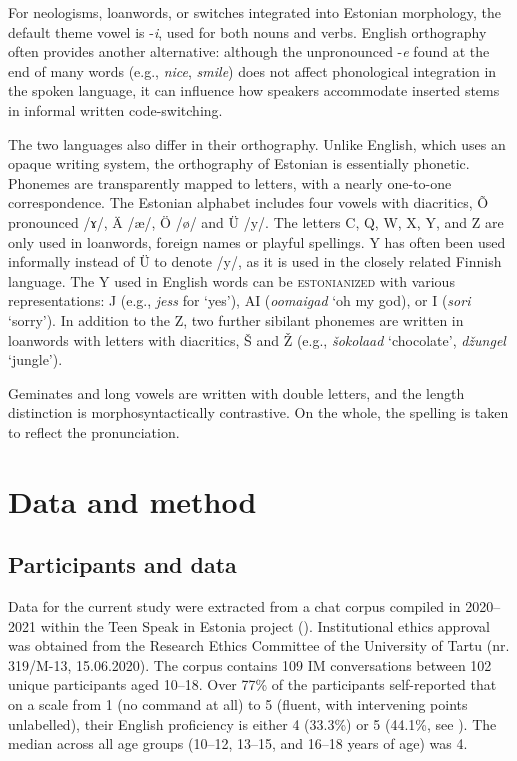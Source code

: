 \documentclass[output=paper]{langscibook}
\begin{document}
For neologisms, loanwords, or switches integrated into Estonian morphology, the default theme vowel is -\textit{i}, used for both nouns and verbs. English orthography often provides another alternative: although the unpronounced -\textit{e} found at the end of many words (e.g., \textit{nice}, \textit{smile}) does not affect phonological integration in the spoken language, it can influence how speakers accommodate inserted stems in informal written code-switching. 

The two languages also differ in their orthography. Unlike English, which uses an opaque writing system, the orthography of Estonian is essentially phonetic. Phonemes are transparently mapped to letters, with a nearly one-to-one correspondence. The Estonian alphabet includes four vowels with diacritics, Õ pronounced /ɤ/, Ä /æ/, Ö /ø/ and Ü /y/. The letters C, Q, W, X, Y, and Z are only used in loanwords, foreign names or playful spellings. Y has often been used informally instead of Ü to denote /y/, as it is used in the closely related Finnish language. The Y used in English words can be \textsc{estonianized} with various representations: J (e.g., \textit{jess} for ‘yes’), AI (\textit{oomaigad} ‘oh my god), or I (\textit{sori} ‘sorry’). In addition to the Z, two further sibilant phonemes are written in loanwords with letters with diacritics, Š and Ž (e.g., \textit{šokolaad} ‘chocolate’, \textit{džungel} ‘jungle’). 

Geminates and long vowels are written with double letters, and the length distinction is morphosyntactically contrastive. On the whole, the spelling is taken to reflect the pronunciation.

\section{Data and method}\label{sec:vihmanetal:3}
\subsection{Participants and data}\label{sec:vihmanetal:3.1}

Data for the current study were extracted from a chat corpus compiled in 2020--2021 within the Teen Speak in Estonia project (\citealt{KoreinikEtAl2023, VihmanEtAl2023}). Institutional ethics approval was obtained from the Research Ethics Committee of the University of Tartu (nr. 319/M-13, 15.06.2020). The corpus contains 109 IM conversations between 102 unique participants aged 10--18. Over 77\% of the participants self-reported that on a scale from 1 (no command at all) to 5 (fluent, with intervening points unlabelled), their English proficiency is either 4 (33.3\%) or 5 (44.1\%, see ). The median across all age groups (10--12, 13--15, and 16--18 years of age) was 4.
\end{document}
